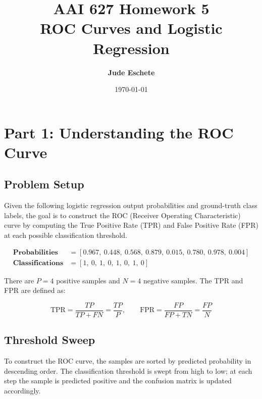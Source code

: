 \documentclass[12pt]{article}
\title{\textbf{AAI 627 Homework 5\\ ROC Curves and Logistic Regression}}
\author{\textbf{Jude Eschete}}
\date{\today}
\begin{document}
	\maketitle
    \newpage
	\section{Part 1: Understanding the ROC Curve}

	\subsection{Problem Setup}

	Given the following logistic regression output probabilities and ground-truth class labels, the goal is to construct the ROC (Receiver Operating Characteristic) curve by computing the True Positive Rate (TPR) and False Positive Rate (FPR) at each possible classification threshold.

	\begin{align*}
		\textbf{Probabilities} &= [0.967,\ 0.448,\ 0.568,\ 0.879,\ 0.015,\ 0.780,\ 0.978,\ 0.004] \\
		\textbf{Classifications} &= [1,\ 0,\ 1,\ 0,\ 1,\ 0,\ 1,\ 0]
	\end{align*}

	There are $P = 4$ positive samples and $N = 4$ negative samples. The TPR and FPR are defined as:

	\begin{equation}
		\text{TPR} = \frac{TP}{TP + FN} = \frac{TP}{P}, \qquad
		\text{FPR} = \frac{FP}{FP + TN} = \frac{FP}{N}
	\end{equation}

	\subsection{Threshold Sweep}

	To construct the ROC curve, the samples are sorted by predicted probability in descending order. The classification threshold is swept from high to low; at each step the sample is predicted positive and the confusion matrix is updated accordingly.
\end{document}
